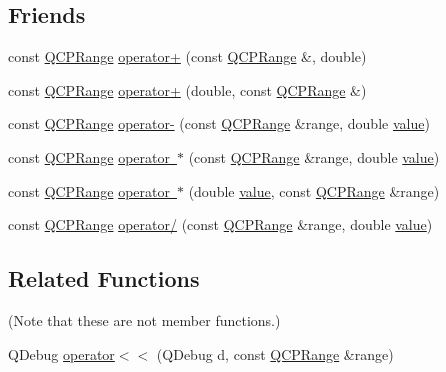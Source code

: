 \subsection*{Friends}
\begin{DoxyCompactItemize}
\item 
const \mbox{\hyperlink{class_q_c_p_range}{Q\+C\+P\+Range}} \mbox{\hyperlink{class_q_c_p_range_af53ea6fb823a4a5897162b865841de04}{operator+}} (const \mbox{\hyperlink{class_q_c_p_range}{Q\+C\+P\+Range}} \&, double)
\item 
const \mbox{\hyperlink{class_q_c_p_range}{Q\+C\+P\+Range}} \mbox{\hyperlink{class_q_c_p_range_a9fb2e9941d32001482df670c0d704977}{operator+}} (double, const \mbox{\hyperlink{class_q_c_p_range}{Q\+C\+P\+Range}} \&)
\item 
const \mbox{\hyperlink{class_q_c_p_range}{Q\+C\+P\+Range}} \mbox{\hyperlink{class_q_c_p_range_a797f82830b516646da8873f82e39e356}{operator-\/}} (const \mbox{\hyperlink{class_q_c_p_range}{Q\+C\+P\+Range}} \&range, double \mbox{\hyperlink{diffusion_8cpp_a4b41795815d9f3d03abfc739e666d5da}{value}})
\item 
const \mbox{\hyperlink{class_q_c_p_range}{Q\+C\+P\+Range}} \mbox{\hyperlink{class_q_c_p_range_aa28aa343c7cc247ea00d26d9dcbac75f}{operator $\ast$}} (const \mbox{\hyperlink{class_q_c_p_range}{Q\+C\+P\+Range}} \&range, double \mbox{\hyperlink{diffusion_8cpp_a4b41795815d9f3d03abfc739e666d5da}{value}})
\item 
const \mbox{\hyperlink{class_q_c_p_range}{Q\+C\+P\+Range}} \mbox{\hyperlink{class_q_c_p_range_a1bbd40705b837cf87032e1a4380e036a}{operator $\ast$}} (double \mbox{\hyperlink{diffusion_8cpp_a4b41795815d9f3d03abfc739e666d5da}{value}}, const \mbox{\hyperlink{class_q_c_p_range}{Q\+C\+P\+Range}} \&range)
\item 
const \mbox{\hyperlink{class_q_c_p_range}{Q\+C\+P\+Range}} \mbox{\hyperlink{class_q_c_p_range_a4b366a3a21974c88e09b0d39d4a24a4b}{operator/}} (const \mbox{\hyperlink{class_q_c_p_range}{Q\+C\+P\+Range}} \&range, double \mbox{\hyperlink{diffusion_8cpp_a4b41795815d9f3d03abfc739e666d5da}{value}})
\end{DoxyCompactItemize}
\subsection*{Related Functions}
(Note that these are not member functions.) \begin{DoxyCompactItemize}
\item 
Q\+Debug \mbox{\hyperlink{class_q_c_p_range_ab4b7d434541ec2e2e00ef3764dde90d8}{operator$<$$<$}} (Q\+Debug d, const \mbox{\hyperlink{class_q_c_p_range}{Q\+C\+P\+Range}} \&range)
\end{DoxyCompactItemize}


